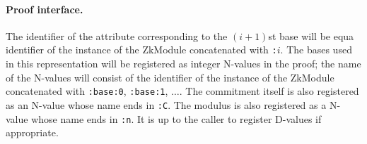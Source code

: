     \paragraph{Proof interface.}
    The identifier of the attribute corresponding to the $(i+1)$st base will
    be equa identifier of the instance of the ZkModule concatenated
    with \texttt{:$i$}.
    The bases used in this representation will be registered as integer N-values in
    the proof; the name of the N-values will consist of the identifier of the instance
    of the ZkModule concatenated with \texttt{:base:0}, \texttt{:base:1}, $\ldots$.
    The commitment itself is also registered as
    an N-value whose name ends in \texttt{:C}. The modulus is also registered as a
    N-value whose name ends in \texttt{:n}. It is up to the caller to register D-values
    if appropriate.

